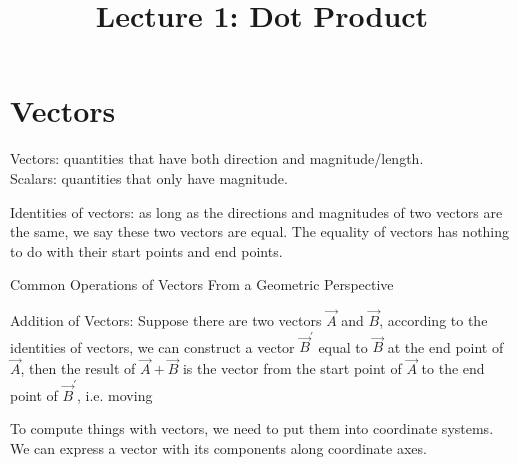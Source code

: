 \documentclass{article}
\title{Lecture 1: Dot Product}
\date{}
\begin{document}
\maketitle

\section{Vectors}

Vectors: quantities that have both direction and magnitude/length. \\
Scalars: quantities that only have magnitude.

Identities of vectors: as long as the directions and magnitudes of two vectors are the same, we say these two vectors are equal. The equality of vectors has nothing to do with their start points and end points.

Common Operations of Vectors From a Geometric Perspective

Addition of Vectors: Suppose there are two vectors $\vec{A}$ and $\vec{B}$, according to the identities of vectors, we can construct a vector $\vec{B}^{'}$ equal to $\vec{B}$ at the end point of $\vec{A}$, then the result of $\vec{A} + \vec{B}$ is the vector from the start point of $\vec{A}$ to the end point of $\vec{B}^{'}$, i.e. moving

To compute things with vectors, we need to put them into coordinate systems. We can express a vector with its components along coordinate axes. 
\end{document}
